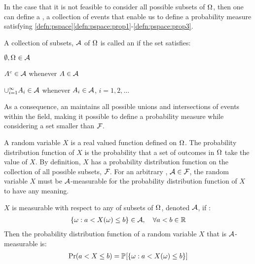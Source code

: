 In the case that it is not feasible to consider all possible subsets of $\Omega_{{}}$, then one can define a \ofield{}, a collection of events that enable us to define a probability measure satisfying \cref{defn:pspace}\ref{defn:pspace:prop1}-\ref{defn:pspace:prop3}.

\begin{defn}
	\label{defn:ofield}
	A collection of subsets, $\mathcal{A}{}$ of  $\Omega_{{}}$ is called an \ofield{} if the set satisfies:
	\begin{thmprop}
		\item \label{defn:ofield:prop1} $\emptyset, \Omega_{{}} \in \mathcal{A}{}$
		\item \label{defn:ofield:prop2} $A^c \in \mathcal{A}{}$ whenever $A \in \mathcal{A}{}$
		\item \label{defn:ofield:prop3} $\cup_{i=1}^{\infty}A_i \in \mathcal{A}{}$ whenever $A_i \in \mathcal{A}{}$, $i=1,2, \hdots $
	\end{thmprop}
\end{defn} As a consequence, an \ofield{} maintains all possible unions and intersections of events within the field, making it possible to define a probability measure while considering a set smaller than $\mathcal{F}_{{}}$. 

A random variable $X$ is a real valued function defined on $\Omega_{{}}$. The probability distribution function of $X$ is the probability that a set of outcomes  in $\Omega_{{}}$ take the value of $X$. By definition, $X$ has a probability distribution function on the collection of all possible subsets, $\mathcal{F}_{{}}$. For an arbitrary \ofield{}, $\mathcal{A}{} \in \mathcal{F}_{{}}$, the random variable $X$ must be $\mathcal{A}{}$-measurable for the probability distribution function of $X$ to have any meaning. 

\begin{defn}
	$X$ is measurable with respect to any \ofield{} of subsets of $\Omega_{{}}$, denoted $\mathcal{A}{}$, if :
	\begin{align}
	\{\omega: a < X(\omega) \leq b \} \in \mathcal{A}{}, \quad \forall a < b \in \mathbb{R}
	\end{align}
	Then the probability distribution function of a random variable $X$ that is $\mathcal{A}{}$-measurable is:
	\begin{align}
	\mathrm{Pr}(a < X \leq b ) = \mathbb{P}_{{}}{[\{\omega: a < X(\omega) \leq b \} ]}
	\end{align}
\end{defn}

